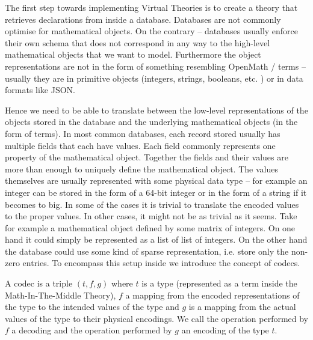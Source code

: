 The first step towards implementing Virtual Theories is to create a theory that retrieves
declarations from inside a database. Databases are not commonly optimise for mathematical
objects. On the contrary -- databases usually enforce their own schema that does not
correspond in any way to the high-level mathematical objects that we want to
model. Furthermore the object representations are not in the form of something resembling
OpenMath / \MMT terms -- usually they are in primitive objects (integers, strings,
booleans, etc. ) or in data formats like JSON.

Hence we need to be able to translate between the low-level representations of the objects
stored in the database and the underlying mathematical objects (in the form of \MMT terms). In
most common databases, each record stored usually has multiple fields that each have values.
Each field commonly represents one property of the mathematical object. Together the fields and
their values are more than enough to uniquely define the mathematical object. The values
themselves are usually represented with some physical data type -- for example an integer can
be stored in the form of a 64-bit integer or in the form of a string if it becomes to big. In
some of the cases it is trivial to translate the encoded values to the proper values. In other
cases, it might not be as trivial as it seems. Take for example a mathematical object defined
by some matrix of integers. On one hand it could simply be represented as a list of list of
integers. On the other hand the database could use some kind of sparse representation, i.e.
store only the non-zero entries. To encompass this setup inside \MMT we introduce the concept
of codecs.

\begin{mydef}[Codec]
  A codec is a triple $(t, f, g)$ where $t$ is a type (represented as a term inside the
  Math-In-The-Middle Theory), $f$ a mapping from the encoded representations of the type
  to the intended values of the type and $g$ is a mapping from the actual values of the
  type to their physical encodings. We call the operation performed by $f$ a decoding and
  the operation performed by $g$ an encoding of the type $t$.
\end{mydef}

